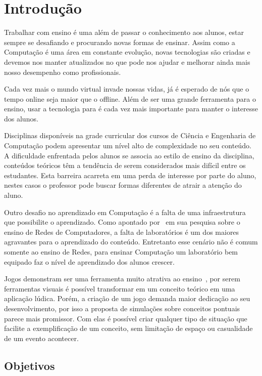 \documentclass[tcc,capa]{texufpel}
\begin{document}
\tableofcontents

\chapter{Introdução}
\label{cap: introducao}

Trabalhar com ensino é uma além de passar o conhecimento aos alunos, estar sempre se desafiando e procurando novas formas de ensinar. Assim como a Computação é uma área em constante evolução, novas tecnologias são criadas e devemos nos manter atualizados no que pode nos ajudar e melhorar ainda mais nosso desempenho como profissionais. 

Cada vez mais o mundo virtual invade nossas vidas, já é esperado de nós que o tempo online seja maior que o offline. Além de ser uma grande ferramenta para o ensino, usar a tecnologia para é cada vez mais importante para manter o interesse dos alunos. 

Disciplinas disponíveis na grade curricular dos cursos de Ciência e Engenharia de Computação podem apresentar um nível alto de complexidade no seu conteúdo. A dificuldade enfrentada pelos alunos se associa ao estilo de ensino da disciplina, conteúdos teóricos têm a tendência de serem considerados mais difícil entre os estudantes. Esta barreira acarreta em uma perda de interesse por parte do aluno, nestes casos o professor pode buscar formas diferentes de atrair a atenção do aluno.

Outro desafio no aprendizado em Computação é a falta de uma infraestrutura que possibilite o aprendizado. Como apontado por~\cite{rauen2003abordagem} em sua pesquisa sobre o ensino de Redes de Computadores, a falta de laboratórios é um dos maiores agravantes para o aprendizado do conteúdo. Entretanto esse cenário não é comum somente ao ensino de Redes, para ensinar  Computação um laboratório bem equipado faz o nível de aprendizado dos alunos crescer.

Jogos demonstram ser uma ferramenta muito atrativa ao ensino~\cite{klawe1999computer}, por serem ferramentas visuais é possível transformar em um conceito teórico em uma aplicação lúdica. Porém, a criação de um jogo demanda maior dedicação ao seu desenvolvimento, por isso a proposta de simulações sobre conceitos pontuais parece mais promissor. Com elas é possível criar qualquer tipo de situação que facilite a exemplificação de um conceito, sem limitação de espaço ou casualidade de um evento acontecer. 

\section{Objetivos}
\end{document}
